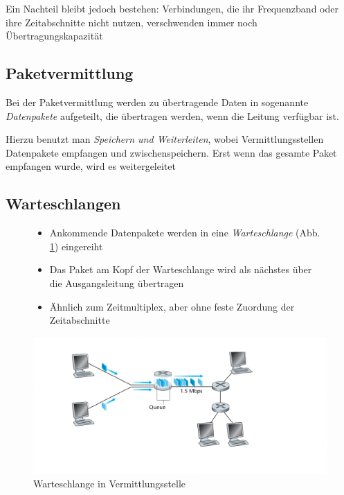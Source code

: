 \documentclass[12pt]{report}
\begin{document}
Ein Nachteil bleibt jedoch bestehen: Verbindungen, die ihr Frequenzband oder ihre Zeitabschnitte nicht nutzen,
verschwenden immer noch Übertragungskapazität

\subsection{Paketvermittlung}
\begin{defbox}
  Bei der Paketvermittlung werden zu übertragende Daten in sogenannte \textit{Datenpakete} aufgeteilt,
  die übertragen werden, wenn die Leitung verfügbar ist.
  
  Hierzu benutzt man \textit{Speichern und Weiterleiten}, 
  wobei Vermittlungsstellen Datenpakete empfangen und zwischenspeichern. 
  Erst wenn das gesamte Paket empfangen wurde, wird es weitergeleitet
\end{defbox}

\subsection{Warteschlangen}
\begin{figure}[H]
  \begin{minipage}[t]{0.45\textwidth}
    \begin{itemize}
      \item Ankommende Datenpakete werden in eine \textit{Warteschlange} (Abb. \ref{fig:warteschlange}) eingereiht
      \item Das Paket am Kopf der Warteschlange wird als nächstes über die Ausgangsleitung übertragen
      \item Ähnlich zum Zeitmultiplex, aber ohne feste Zuordung der Zeitabschnitte
    \end{itemize}
  \end{minipage}
  \hfill
  \begin{minipage}[t]{0.45\textwidth}
    \caption{Warteschlange in Vermittlungsstelle}
    \label{fig:warteschlange}
    \centering
    \includegraphics[width=1.2\textwidth]{warteschlange}
  \end{minipage}
\end{figure}
\end{document}
